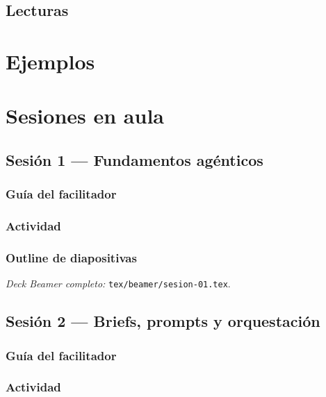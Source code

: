 \documentclass[11pt,a4paper]{report}
\begin{document}
\section{Lecturas}


\chapter{Ejemplos}


\chapter{Sesiones en aula}

\section{Sesión 1 --- Fundamentos agénticos}

\subsection*{Guía del facilitador}

\subsection*{Actividad}

\subsection*{Outline de diapositivas}

\textit{Deck Beamer completo:} \texttt{tex/beamer/sesion-01.tex}.

\section{Sesión 2 --- Briefs, prompts y orquestación}

\subsection*{Guía del facilitador}

\subsection*{Actividad}

\end{document}
